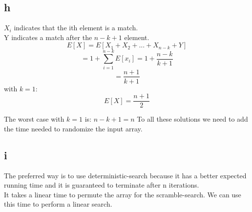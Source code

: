 \subsection*{h}
$X_i$ indicates that the ith element is a match.\\
Y indicates a match after the $n - k + 1$ element.
\begin{equation*}
    E[X] = E[X_1 + X_2 + ... + X_{n - k} + Y]
\end{equation*}
\begin{equation*}
    = 1 + \sum_{i = 1}^{n - k}E[x_i] = 1 + \frac{n - k}{k + 1}
\end{equation*}
\begin{equation*}
    = \frac{n + 1}{k + 1}
\end{equation*}
with $k = 1$:
\begin{equation*}
    E[X] = \frac{n + 1}{2}
\end{equation*}

The worst case with $k = 1$ is: $n - k + 1 = n$
To all these solutions we need to add the time needed to randomize the input array.
\subsection{i}
The preferred way is to use deterministic-search because it has a better expected running time and it is guaranteed to terminate after n iterations.\\
It takes a linear time to permute the array for the scramble-search. We can use this time to perform a linear search.
